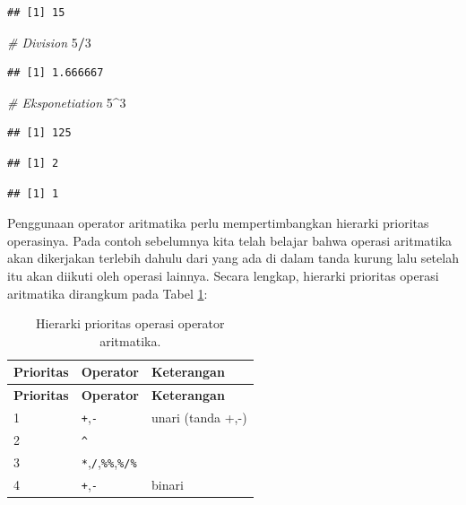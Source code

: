 \documentclass[12pt,]{krantz}
\newenvironment{Shaded}{\begin{snugshade}}{\end{snugshade}}
\newcommand{\CommentTok}[1]{\textcolor[rgb]{0.56,0.35,0.01}{\textit{#1}}}
\newcommand{\DecValTok}[1]{\textcolor[rgb]{0.00,0.00,0.81}{#1}}
\newcommand{\OperatorTok}[1]{\textcolor[rgb]{0.81,0.36,0.00}{\textbf{#1}}}
\begin{document}
\begin{verbatim}
## [1] 15
\end{verbatim}

\begin{Shaded}
\begin{Highlighting}[]
\CommentTok{# Division}
\DecValTok{5}\OperatorTok{/}\DecValTok{3}
\end{Highlighting}
\end{Shaded}

\begin{verbatim}
## [1] 1.666667
\end{verbatim}

\begin{Shaded}
\begin{Highlighting}[]
\CommentTok{# Eksponetiation}
\DecValTok{5}\OperatorTok{^}\DecValTok{3}
\end{Highlighting}
\end{Shaded}

\begin{verbatim}
## [1] 125
\end{verbatim}

\begin{Shaded}
\end{Shaded}

\begin{verbatim}
## [1] 2
\end{verbatim}

\begin{Shaded}
\end{Shaded}

\begin{verbatim}
## [1] 1
\end{verbatim}

Penggunaan operator aritmatika perlu mempertimbangkan hierarki prioritas operasinya. Pada contoh sebelumnya kita telah belajar bahwa operasi aritmatika akan dikerjakan terlebih dahulu dari yang ada di dalam tanda kurung lalu setelah itu akan diikuti oleh operasi lainnya. Secara lengkap, hierarki prioritas operasi aritmatika dirangkum pada Tabel \ref{tab:hieraritop}:

\begin{longtable}[]{@{}lll@{}}
\caption{\label{tab:hieraritop} Hierarki prioritas operasi operator aritmatika.}\tabularnewline
\toprule
\textbf{Prioritas} & \textbf{Operator} & \textbf{Keterangan}\tabularnewline
\midrule
\endfirsthead
\toprule
\textbf{Prioritas} & \textbf{Operator} & \textbf{Keterangan}\tabularnewline
\midrule
\endhead
1 & \texttt{+},\texttt{-} & unari (tanda +,-)\tabularnewline
2 & \texttt{\^{}} &\tabularnewline
3 & \texttt{*},\texttt{/},\texttt{\%\%},\texttt{\%/\%} &\tabularnewline
4 & \texttt{+},\texttt{-} & binari\tabularnewline
\bottomrule
\end{longtable}
\end{document}
